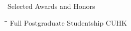 
\begin{rSection}{Selected Awards and Honors}
\begin{tabbing}
\hspace{3.6in}\= \hspace{2.1in}\= \kill
    Full Postgraduate Studentship                \> CUHK                             \\
\end{tabbing}
\end{rSection}

